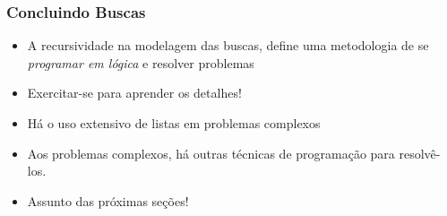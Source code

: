 \begin{frame}[fragile]
\frametitle{Concluindo Buscas}

\begin{block}{}
\begin{itemize}
  
  
  \item A recursividade na modelagem das buscas, define uma metodologia de se \textit{programar em lógica} e resolver problemas
    \pause
  \item Exercitar-se para aprender os detalhes!
    \pause
  \item Há o uso extensivo de listas em problemas complexos
  
  \pause
  \item Aos problemas complexos, há outras técnicas de programação
  para resolvê-los.
  
  
  \pause
  \item Assunto das próximas seções!
\end{itemize}

\end{block}

\end{frame}

